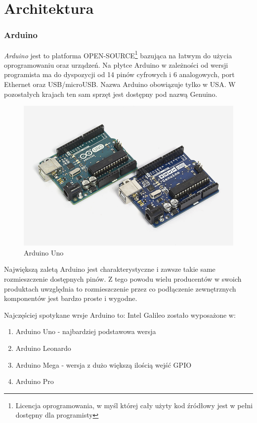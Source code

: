 \documentclass{xmgr}
\begin{document}
\chapter{Architektura}
\subsection{Arduino}
\emph{Arduino} jest to platforma OPEN-SOURCE\footnote{Licencja oprogramowania, w myśl której cały użyty kod źródłowy jest w pełni dostępny dla programisty} bazująca na łatwym do użycia oprogramowaniu oraz urządzeń. Na płytce Arduino w zależności od wersji programista ma do dyspozycji od 14 pinów cyfrowych i 6 analogowych, port Ethernet oraz USB/microUSB. Nazwa Arduino obowiązuje tylko w USA. W pozostałych krajach ten sam sprzęt jest dostępny pod nazwą Genuino.

\begin{figure}[!h]
    \centering
    \includegraphics[height=0.4\textwidth]{images/uno.jpg}
    \caption{Arduino Uno \label{Arduino Uno}}
\end{figure}

Największą zaletą Arduino jest charakterystyczne i zawsze takie same rozmieszczenie dostępnych pinów. Z tego powodu wielu producentów w swoich produktach uwzględnia to rozmieszczenie przez co podłączenie zewnętrznych komponentów jest bardzo proste i wygodne.

Najczęściej spotykane wrsje Arduino to:
Intel Galileo zostało wyposażone w:
\begin{enumerate}
  \item Arduino Uno - najbardziej podstawowa wersja
  \item Arduino Leonardo
  \item Arduino Mega - wersja z dużo większą ilością wejść GPIO
  \item Arduino Pro
\end{enumerate}
\end{document}
